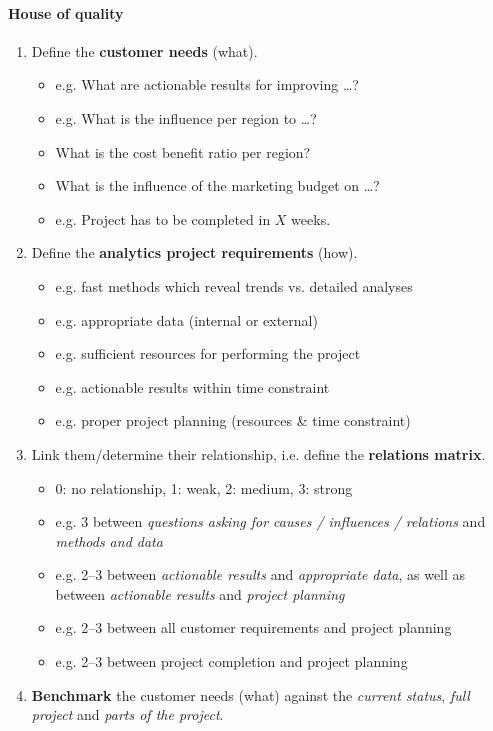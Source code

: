 \documentclass[a4paper, landscape, 6pt, fleqn]{scrartcl}
\renewcommand{\emph}[1]{\textbf{#1}}
\begin{document}
\begin{multicols*}{4}
\paragraph{House of quality}

\begin{enumerate}
\item Define the \emph{customer needs} (what).
\begin{itemize}
\item e.g. What are actionable results for improving \ldots ?
\item e.g. What is the influence per region to \ldots?
\item What is the cost benefit ratio per region?
\item What is the influence of the marketing budget on \ldots ?
\item e.g. Project has to be completed in $X$ weeks.
\end{itemize}
\item Define the \emph{analytics project requirements} (how).
\begin{itemize}
\item e.g. fast methods which reveal trends vs. detailed analyses
\item e.g. appropriate data (internal or external)
\item e.g. sufficient resources for performing the project
\item e.g. actionable results within time constraint
\item e.g. proper project planning (resources \& time constraint)
\end{itemize}
\item Link them/determine their relationship, i.e. define the \emph{relations matrix}.
\begin{itemize}
\item 0: no relationship, 1: weak, 2: medium, 3: strong
\item e.g. 3 between \textit{questions asking for causes / influences / relations} and \textit{methods and data}
\item e.g. 2--3 between \textit{actionable results} and \textit{appropriate data}, as well as between \textit{actionable results} and \textit{project planning}
\item e.g. 2--3 between all customer requirements and project planning
\item e.g. 2--3 between project completion and project planning
\end{itemize}
\item \emph{Benchmark} the customer needs (what) against the \textit{current status}, \textit{full project} and \textit{parts of the project}.

\end{enumerate}
\end{multicols*}
\end{document}
